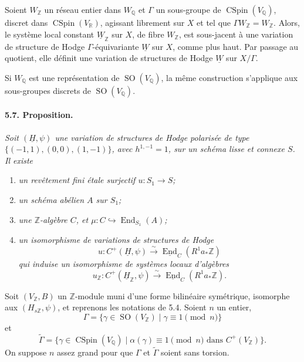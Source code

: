 \documentclass[10pt,leqno]{article}
\newcommand{\Q}{\mathbb{Q}}
\newcommand{\R}{\mathbb{R}}
\newcommand{\Z}{\mathbb{Z}}
\newcommand{\End}{\operatorname{End}}
\newcommand{\SO}{\operatorname{SO}}
\newcommand{\CSpin}{\operatorname{CSpin}}
\begin{document}
Soient $W_\Z$ un réseau entier dans $W_\Q$ et $\Gamma$ un sous-groupe de $\CSpin(V_\Q)$, discret dans $\CSpin(V_\R)$, agissant librement sur $X$ et tel que $\Gamma W_\Z=W_\Z$. Alors, le système local constant $\underline W_\Z$ sur $X$, de fibre $W_\Z$, est sous-jacent à une variation de structure de Hodge $\Gamma$-équivariante $\underline W$ sur $X$, comme plus haut. Par passage au quotient, elle définit une variation de structures de Hodge $\underline W$ sur $X/\Gamma$.

\clearpage

Si $W_\Q$ est une représentation de $\SO(V_\Q)$, la même construction s'applique aux sous-groupes discrets de $\SO(V_\Q)$.

\paragraph{5.7. Proposition.} \emph{Soit $(\underline H,\psi)$ une variation de structures de Hodge polarisée de type $\{(-1,1),(0,0),(1,-1)\}$, avec $h^{1,-1}=1$, sur un schéma lisse et connexe $S$. Il existe}
\begin{enumerate}[label=\alph*)]
\item \emph{un revêtement fini étale surjectif $u:S_1\to S$;}
\item \emph{un schéma abélien $A$ sur $S_1$;}
\item \emph{une $\Z$-algèbre $C$, et $\mu:C\hookrightarrow\End_{S_1}(A)$;}
\item \emph{un isomorphisme de variations de structures de Hodge}
\[
u:C^+(\underline H,\psi)\xrightarrow{\sim}\underline{\End}_C(R^1a_*\Z)
\]
\emph{qui induise un isomorphisme de systèmes locaux d'algèbres}
\[
u_\Z:C^+(\underline H_\Z,\psi)\xrightarrow{\sim}\underline{\End}_C(R^1a_*\Z).
\]
\end{enumerate}

Soit $(V_\Z,B)$ un $\Z$-module muni d'une forme bilinéaire symétrique, isomorphe aux $(H_{s\Z},\psi)$, et reprenons les notations de 5.4. Soient $n$ un entier,
\[
\Gamma=\{\gamma\in\SO(V_\Z)\mid\gamma\equiv1\pmod n\}
\]
et
\[
\widetilde\Gamma=\{\gamma\in\CSpin(V_\Q)\mid\alpha(\gamma)\equiv1\pmod n\text{ dans }C^+(V_\Z)\}.
\]
On suppose $n$ assez grand pour que $\Gamma$ et $\widetilde\Gamma$ soient sans torsion.
\end{document}
